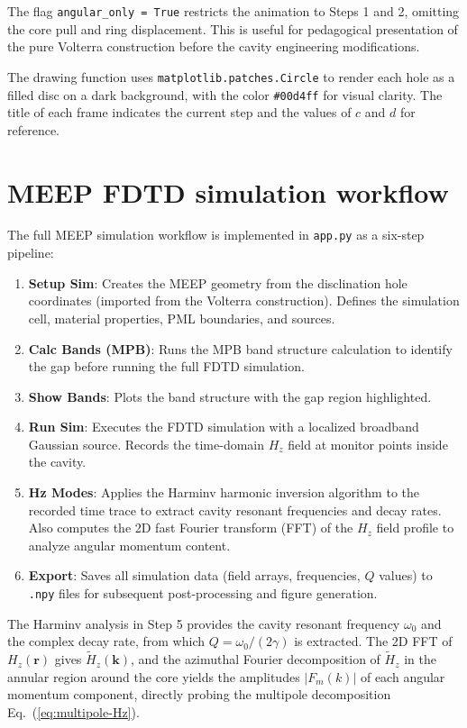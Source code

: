 \documentclass[12pt,a4paper,oneside]{book}
\theoremstyle{plain}
\theoremstyle{definition}
\theoremstyle{remark}
\newcommand{\eqnref}[1]{Eq.~(\ref{#1})}
\newcommand{\vb}[1]{\bm{#1}}
\newcommand{\om}{\omega}
\newcommand{\kvec}{\vb{k}}
\newcommand{\rvec}{\vb{r}}
\begin{document}
The flag \texttt{angular\_only = True} restricts the animation to Steps 1 and 2, omitting the core pull and ring displacement. This is useful for pedagogical presentation of the pure Volterra construction before the cavity engineering modifications.

The drawing function uses \texttt{matplotlib.patches.Circle} to render each hole as a filled disc on a dark background, with the color \texttt{\#00d4ff} for visual clarity. The title of each frame indicates the current step and the values of $c$ and $d$ for reference.

\section{MEEP FDTD simulation workflow}
\label{sec:meep-workflow}

The full MEEP simulation workflow is implemented in \texttt{app.py} as a six-step pipeline:

\begin{enumerate}
  \item \textbf{Setup Sim}: Creates the MEEP geometry from the disclination hole coordinates (imported from the Volterra construction). Defines the simulation cell, material properties, PML boundaries, and sources.
  \item \textbf{Calc Bands (MPB)}: Runs the MPB band structure calculation to identify the gap before running the full FDTD simulation.
  \item \textbf{Show Bands}: Plots the band structure with the gap region highlighted.
  \item \textbf{Run Sim}: Executes the FDTD simulation with a localized broadband Gaussian source. Records the time-domain $H_z$ field at monitor points inside the cavity.
  \item \textbf{Hz Modes}: Applies the Harminv harmonic inversion algorithm to the recorded time trace to extract cavity resonant frequencies and decay rates. Also computes the 2D fast Fourier transform (FFT) of the $H_z$ field profile to analyze angular momentum content.
  \item \textbf{Export}: Saves all simulation data (field arrays, frequencies, $Q$ values) to \texttt{.npy} files for subsequent post-processing and figure generation.
\end{enumerate}

The Harminv analysis in Step 5 provides the cavity resonant frequency $\om_0$ and the complex decay rate, from which $Q = \om_0/(2\gamma)$ is extracted. The 2D FFT of $H_z(\rvec)$ gives $\tilde{H}_z(\kvec)$, and the azimuthal Fourier decomposition of $\tilde{H}_z$ in the annular region around the core yields the amplitudes $|F_m(k)|$ of each angular momentum component, directly probing the multipole decomposition \eqnref{eq:multipole-Hz}.
\end{document}
